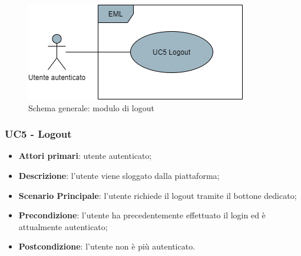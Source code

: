 \begin{figure}[H]
\centering
\includegraphics[scale=0.6]{res/UseCase/Immagini/Logout}
\caption{Schema generale: modulo di logout}
\end{figure}

\subsubsection{UC5 - Logout}
\begin{itemize}
\item \textbf{Attori primari}: utente autenticato;
\item \textbf{Descrizione}: l'utente viene sloggato dalla piattaforma;
\item \textbf{Scenario Principale}: l'utente richiede il logout tramite il bottone dedicato;
\item \textbf{Precondizione}: l'utente ha precedentemente effettuato il login ed è attualmente autenticato;
\item \textbf{Postcondizione}: l'utente non è più autenticato.
\end{itemize}